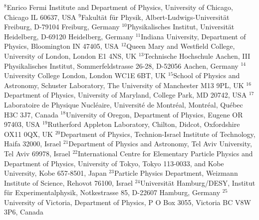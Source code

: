 {\newline
$^{  8}$Enrico Fermi Institute and Department of Physics, University of Chicago, Chicago IL 60637, USA
\newline
$^{  9}$Fakult\"at f\"ur Physik, Albert-Ludwigs-Universit\"at 
Freiburg, D-79104 Freiburg, Germany
\newline
$^{ 10}$Physikalisches Institut, Universit\"at
Heidelberg, D-69120 Heidelberg, Germany
\newline
$^{ 11}$Indiana University, Department of Physics,
Bloomington IN 47405, USA
\newline
$^{ 12}$Queen Mary and Westfield College, University of London,
London E1 4NS, UK
\newline
$^{ 13}$Technische Hochschule Aachen, III Physikalisches Institut,
Sommerfeldstrasse 26-28, D-52056 Aachen, Germany
\newline
$^{ 14}$University College London, London WC1E 6BT, UK
\newline
$^{ 15}$School of Physics and Astronomy, Schuster Laboratory, The University
of Manchester M13 9PL, UK
\newline
$^{ 16}$Department of Physics, University of Maryland,
College Park, MD 20742, USA
\newline
$^{ 17}$Laboratoire de Physique Nucl\'eaire, Universit\'e de Montr\'eal,
Montr\'eal, Qu\'ebec H3C 3J7, Canada
\newline
$^{ 18}$University of Oregon, Department of Physics, Eugene
OR 97403, USA
\newline
$^{ 19}$Rutherford Appleton Laboratory, Chilton,
Didcot, Oxfordshire OX11 0QX, UK
\newline
$^{ 20}$Department of Physics, Technion-Israel Institute of
Technology, Haifa 32000, Israel
\newline
$^{ 21}$Department of Physics and Astronomy, Tel Aviv University,
Tel Aviv 69978, Israel
\newline
$^{ 22}$International Centre for Elementary Particle Physics and
Department of Physics, University of Tokyo, Tokyo 113-0033, and
Kobe University, Kobe 657-8501, Japan
\newline
$^{ 23}$Particle Physics Department, Weizmann Institute of Science,
Rehovot 76100, Israel
\newline
$^{ 24}$Universit\"at Hamburg/DESY, Institut f\"ur Experimentalphysik, 
Notkestrasse 85, D-22607 Hamburg, Germany
\newline
$^{ 25}$University of Victoria, Department of Physics, P O Box 3055,
Victoria BC V8W 3P6, Canada
}
